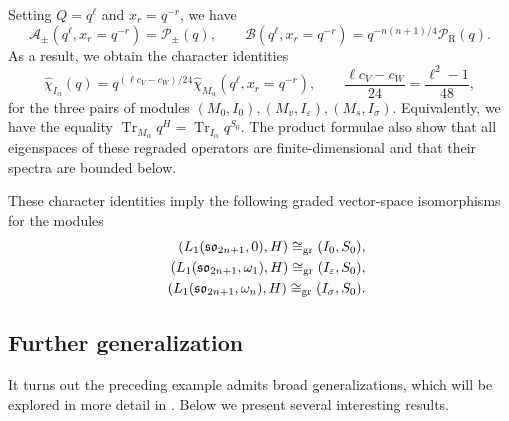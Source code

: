 \documentclass[a4paper,11pt]{article}
\theoremstyle{definition}
\theoremstyle{definition}
\theoremstyle{remark}
\newcommand{\be}{\begin{equation}}
\newcommand{\ee}{\end{equation}}
\newcommand{\beqn}{\begin{eqnarray}}
\newcommand{\eeqn}{\end{eqnarray}}
\begin{document}
Setting $Q=q^\ell$ and $x_r=q^{-r}$, we have
\be 
\mathcal A_\pm(q^\ell,x_r=q^{-r}) =\mathcal P_\pm(q), \qquad
\mathcal B(q^\ell,x_r=q^{-r}) =q^{-n(n+1)/4}\mathcal P_{\mathrm R}(q).
\ee
As a result,  we obtain the character identities  
\be\label{eq:Bn-Ising-normalized-character-identity}
\widehat\chi_{I_\alpha}(q)
 =q^{(\ell c_V-c_W)/24}
\widehat\chi_{M_\alpha}(q^\ell,x_r=q^{-r}),\qquad \frac{\ell c_V-c_W}{24} =\frac{\ell^2-1}{48},
\ee
for the  three pairs of modules $(M_0,I_0),(M_v,I_\varepsilon),(M_s,I_\sigma)$. 
Equivalently, we have the equality  $\operatorname{Tr}_{M_\alpha}q^H=\operatorname{Tr}_{I_\alpha}q^{S_0}$.  The product formulae also show that all eigenspaces of these regraded
operators are finite-dimensional and that their spectra are bounded below.   
 
These character identities imply the following graded vector-space isomorphisms for 
the modules
\beqn
&& (L_1(\mathfrak{so}_{2n+1},0),H)\cong_{\rm gr}(I_0,S_0),
\nonumber\\
&& (L_1(\mathfrak{so}_{2n+1},\omega_1),H)\cong_{\rm gr}(I_\varepsilon,S_0),
\nonumber\\
&& (L_1(\mathfrak{so}_{2n+1},\omega_n),H)\cong_{\rm gr}(I_\sigma,S_0).
\eeqn
 
 
\subsection{Further generalization}

 
It turns out the  preceding example admits broad generalizations, which will be explored in more detail in  \cite{Jiang2027}. Below we present several interesting   results. 
\end{document}
